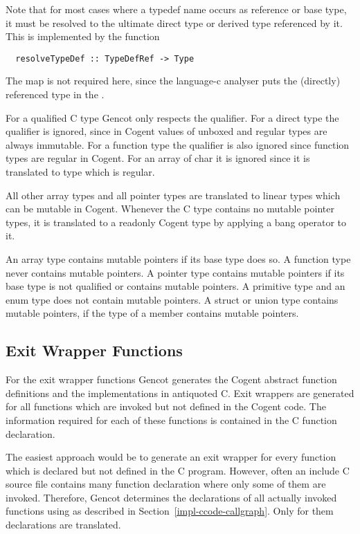 Note that for most cases where a typedef name occurs as reference or base type, it must be resolved to
the ultimate direct type or derived type referenced by it. This is implemented by the function
\begin{verbatim}
  resolveTypeDef :: TypeDefRef -> Type 
\end{verbatim}
The  map is not required here, since the language-c analyser puts the (directly) 
referenced type in the . 

For a qualified C type Gencot only respects the  qualifier. For a direct type the 
qualifier is ignored, since in Cogent values of unboxed and regular types are always immutable. For
a function type the qualifier is also ignored since function types are regular in Cogent. For an array
of char it is ignored since it is translated to type  which is regular.

All other array types and all pointer types are translated to linear types which can be mutable in
Cogent. Whenever the C type contains no mutable pointer types, it is translated to a readonly Cogent type by 
applying a bang operator to it.

An array type contains mutable pointers if its base type does so. A function type never contains mutable pointers.
A pointer type contains mutable pointers if its base type is not  qualified or contains mutable pointers.
A primitive type and an enum type does not contain mutable pointers. A struct or union type contains mutable 
pointers, if the type of a member contains mutable pointers.

\subsection{Exit Wrapper Functions}
\label{impl-ccomps-exit}

For the exit wrapper functions Gencot generates the Cogent abstract function definitions and the implementations
in antiquoted C. Exit wrappers are generated for all functions which are invoked but not defined in the Cogent code. 
The information required for each of these functions is contained in the C function declaration.

The easiest approach would be to generate an exit wrapper for every function which is declared but 
not defined in the C program. However, often an
include C source file contains many function declaration where only some of them are invoked. Therefore, Gencot
determines the declarations of all actually invoked functions using  as described in 
Section~\ref{impl-ccode-callgraph}. Only for them declarations are translated.

